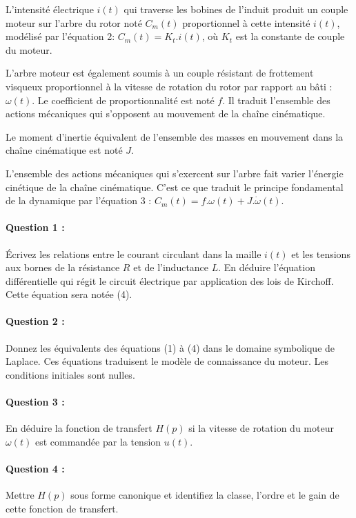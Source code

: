 L'intensité électrique $i(t)$ qui traverse les bobines de l'induit produit un couple moteur sur l'arbre du rotor noté $C_m(t)$ proportionnel à cette intensité $i(t)$, modélisé par l'équation 2: $C_m(t)=K_t.i(t)$, où $K_t$ est la constante de couple du moteur.

L'arbre moteur est également soumis à un couple résistant de frottement visqueux proportionnel à la vitesse de rotation du rotor par rapport au bâti : $\omega(t)$. Le coefficient de proportionnalité est noté $f$. Il traduit l'ensemble des actions mécaniques qui s'opposent au mouvement de la chaîne cinématique.

Le moment d'inertie équivalent de l'ensemble des masses en mouvement dans la chaîne cinématique est noté $J$.

L'ensemble des actions mécaniques qui s'exercent sur l'arbre fait varier l'énergie cinétique de la chaîne cinématique. C'est ce que traduit le principe fondamental de la dynamique par l'équation 3 : $C_m(t)=f.\omega(t)+J.\dot{\omega}(t)$.

\paragraph{Question 1 :} Écrivez les relations entre le courant circulant dans la maille $i(t)$ et les tensions aux bornes de la résistance $R$ et de l'inductance $L$. En déduire l'équation différentielle qui régit le circuit électrique par application des lois de Kirchoff. Cette équation sera notée (4).

\paragraph{Question 2 :} Donnez les équivalents des équations (1) à (4) dans le domaine symbolique de Laplace. Ces équations traduisent le modèle de connaissance du moteur. Les conditions initiales sont nulles.

\paragraph{Question 3 :} En déduire la fonction de transfert $H(p)$ si la vitesse de rotation du moteur $\omega(t)$ est commandée par la tension $u(t)$.

\paragraph{Question 4 :} Mettre $H(p)$ sous forme canonique et identifiez la classe, l'ordre et le gain de cette fonction de transfert.

